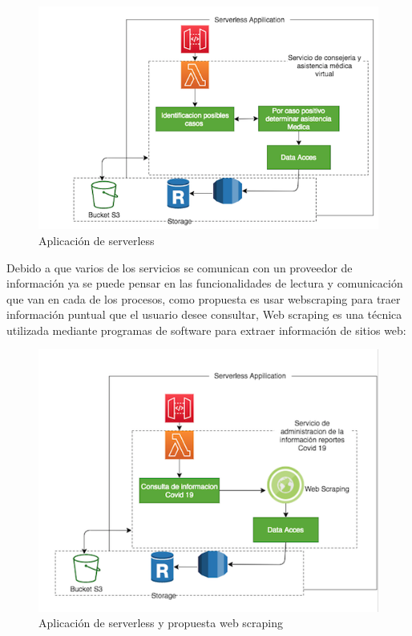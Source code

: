 \documentclass{article}
\begin{document}
\begin{figure}[h] 
    \centering
    \includegraphics[scale=0.45]{Serverless.png}
    \caption{Aplicación de serverless}
    \label{Ser}
\end{figure}

Debido a que varios de los servicios se comunican con un proveedor de información  ya se puede pensar en las funcionalidades de lectura y comunicación que van en cada de los procesos, como propuesta es usar webscraping para traer información puntual que el usuario desee consultar, Web scraping es una técnica utilizada mediante programas de software para extraer información de sitios web:

\begin{figure}[h] 
    \centering
    \includegraphics[scale=0.5]{webs.png}
    \caption{Aplicación de serverless y propuesta web scraping}
    \label{Ser}
\end{figure}
\end{document}

